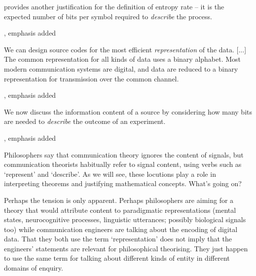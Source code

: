 \documentclass[12pt]{article}
\begin{document}
\begin{myquote}
 provides another justification for the definition of entropy rate -- it is the expected number of bits per symbol required to \textit{describe} the process.
\par\hspace*{\fill}\citet[115]{cover2006elements}, emphasis added
\end{myquote}

\begin{myquote}
We can design source codes for the most efficient \textit{representation} of the data. [...] The common representation for all kinds of data uses a binary alphabet. Most modern communication systems are digital, and data are reduced to a binary representation for transmission over the common channel.
\par\hspace*{\fill}\citet[218]{cover2006elements}, emphasis added
\end{myquote}

\begin{myquote}
We now discuss the information content of a source by considering how many bits are needed to \textit{describe} the outcome of an experiment.
\par\hspace*{\fill}\citet[73]{mackay2003information}, emphasis added
\end{myquote}

\noindent Philosophers say that communication theory ignores the content of signals, but communication theorists habitually refer to signal content, using verbs such as `represent' and `describe'.
As we will see, these locutions play a role in interpreting theorems and justifying mathematical concepts.
What's going on?

Perhaps the tension is only apparent.
Perhaps philosophers are aiming for a theory that would attribute content to paradigmatic representations (mental states, neurocognitive processes, linguistic utterances; possibly biological signals too) while communication engineers are talking about the encoding of digital data.
That they both use the term `representation' does not imply that the engineers' statements are relevant for philosophical theorising.
They just happen to use the same term for talking about different kinds of entity in different domains of enquiry.
\end{document}
